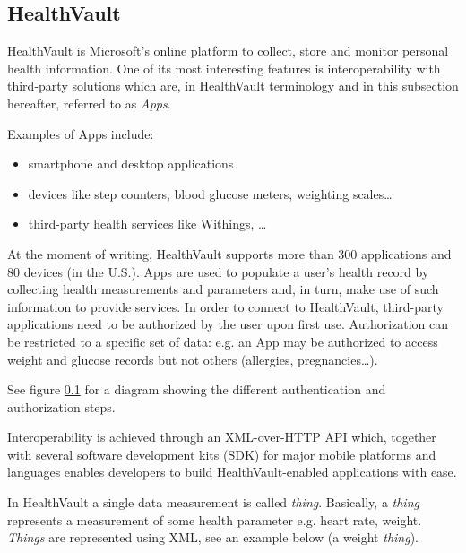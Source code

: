
\subsection{HealthVault} \nocite{HealthVault}

HealthVault is Microsoft's online platform to collect, store and monitor personal health
information. %
One of its most interesting features is interoperability with third-party solutions which are,
in HealthVault terminology and in this subsection hereafter, referred to as \textit{Apps}.

Examples of Apps include:
\begin{itemize}
\item smartphone and desktop applications
\item devices like step counters, blood glucose meters, weighting scales\ldots
\item third-party health services like Withings, \ldots
\end{itemize}

At the moment of writing, HealthVault supports more than 300 applications and 80 devices (in the U.S.).
Apps are used to populate a user's health record by collecting health measurements and parameters and,
in turn, make use of such information to provide services.
In order to connect to HealthVault, third-party applications need to be authorized by the user
upon first use. Authorization can be restricted to a specific set of data: e.g. an App may be
authorized to access weight and glucose records but not others (allergies, pregnancies\ldots).

See figure \ref{} for a diagram showing the different authentication and authorization steps.

Interoperability is achieved through an XML-over-HTTP API which, together with several
software development kits (SDK) for major mobile platforms and languages enables developers
to build HealthVault-enabled applications with ease.

In HealthVault a single data measurement is called \textit{thing}.
Basically, a \textit{thing} represents a measurement of some health parameter
e.g. heart rate, weight.
\textit{Things} are represented using XML, see an example below (a weight \textit{thing}).

